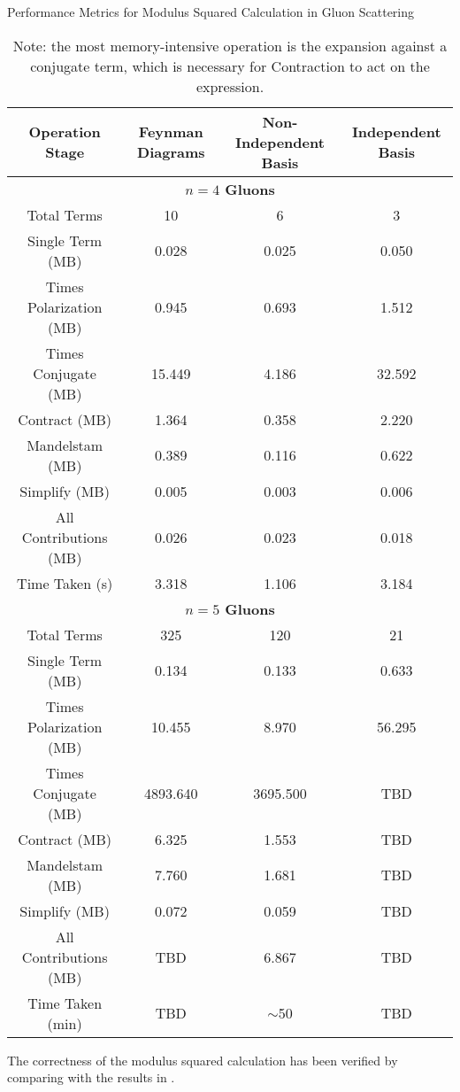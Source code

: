 \documentclass[main.tex]{subfiles}
\begin{document}
\begin{table}[h!]
    \centering
    \caption{Performance Metrics for Modulus Squared Calculation in Gluon Scattering}
    \label{tab:modulus-squared-performance}
    \begin{tabular}{|c|c|c|c|}
        \hline
        \textbf{Operation Stage} & \textbf{Feynman Diagrams} & \textbf{Non-Independent Basis} & \textbf{Independent Basis} \\
        \hline
        \multicolumn{4}{|c|}{\textbf{$n=4$ Gluons}} \\
        \hline
        Total Terms & 10 & 6 & 3 \\
        Single Term (MB) & 0.028 & 0.025 & 0.050 \\
        Times Polarization (MB) & 0.945 & 0.693 & 1.512 \\
        Times Conjugate (MB) & 15.449 & 4.186 & 32.592 \\
        Contract (MB) & 1.364 & 0.358 & 2.220 \\
        Mandelstam (MB) & 0.389 & 0.116 & 0.622\\
        Simplify (MB) & 0.005 & 0.003 & 0.006\\
        All Contributions (MB) & 0.026 & 0.023 & 0.018 \\
        Time Taken (s) & 3.318 & 1.106 & 3.184 \\
        \hline
        \multicolumn{4}{|c|}{\textbf{$n=5$ Gluons}} \\
        \hline
        Total Terms & 325 & 120 & 21 \\
        Single Term (MB) & 0.134 & 0.133 & 0.633 \\
        Times Polarization (MB) & 10.455 & 8.970 & 56.295 \\
        Times Conjugate (MB) & 4893.640 & 3695.500 & TBD \\
        Contract (MB) & 6.325 & 1.553 & TBD \\
        Mandelstam (MB) & 7.760 & 1.681 & TBD \\
        Simplify (MB) & 0.072 & 0.059 & TBD \\
        All Contributions (MB) & TBD & 6.867 & TBD \\
        Time Taken (min) & TBD & $\sim$50 & TBD \\
        \hline
    \end{tabular}
    \caption*{Note: the most memory-intensive operation is the expansion against a conjugate term, which is necessary for Contraction to act on the expression.}
\end{table}

The correctness of the modulus squared calculation has been verified by comparing with the results in \cite{Ellis:1996mzs,BERENDS1981124}.
\end{document}
